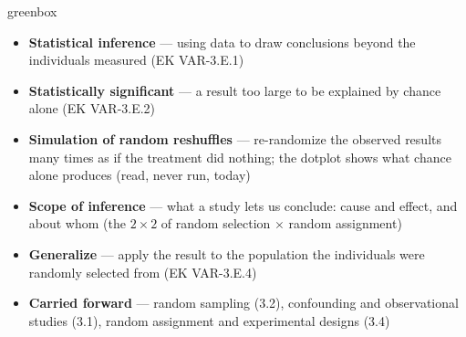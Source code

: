 \documentclass[10pt]{article}
\begin{document}
\boxguard
\begin{skillbox}{greenbox}
\begin{minipage}[t]{0.48\linewidth}
    \begin{itemize}
        \item \textbf{Statistical inference} --- using data to draw conclusions beyond the
              individuals measured (EK VAR-3.E.1)
        \item \textbf{Statistically significant} --- a result too large to be explained by
              chance alone (EK VAR-3.E.2)
        \item \textbf{Simulation of random reshuffles} --- re-randomize the observed results
              many times as if the treatment did nothing; the dotplot shows what chance alone
              produces (read, never run, today)
    \end{itemize}
\end{minipage}
\hfill
\begin{minipage}[t]{0.48\linewidth}
    \begin{itemize}
        \item \textbf{Scope of inference} --- what a study lets us conclude: cause and
              effect, and about whom (the $2\times2$ of random selection $\times$ random
              assignment)
        \item \textbf{Generalize} --- apply the result to the population the individuals
              were randomly selected from (EK VAR-3.E.4)
        \item \textbf{Carried forward} --- random sampling (3.2), confounding and
              observational studies (3.1), random assignment and experimental designs (3.4)
    \end{itemize}
\end{minipage}
\end{skillbox}
\end{document}
